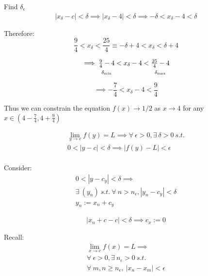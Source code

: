 Find $\delta_\epsilon$
\[
	\begin{gathered}
		|x_\delta - c| < \delta \implies
		|x_\delta - 4| < \delta \implies
		-\delta < x_\delta - 4 < \delta
	\end{gathered}
\]

Therefore:
\[
	\frac{9}{4} < x_\delta < \frac{25}{4} \equiv -\delta + 4 < x_\delta < \delta + 4
\]

\[
	\implies
	\underset{\delta_{\min}}{\rule[-1.5ex]{0pt}{0pt} \tfrac{9}{4} - 4} < x_\delta - 4 <
	\underset{\delta_{\max}}{\rule[-1.5ex]{0pt}{0pt} \tfrac{25}{4} - 4}
\]

\[
	\implies -\frac{7}{4} < x_\delta - 4 < \frac{9}{4}
\]

Thus we can constrain the equation $f(x) \rightarrow 1/2$ as $x \rightarrow 4$ for any $x \in (4-\frac{7}{4}, 4+\frac{9}{4})$


\[
	\begin{gathered}
		\lim_{y \to c} f(y) = L \implies \forall~ \epsilon > 0, \exists~ \delta > 0 ~s.t. \\
		0 < |y-c| < \delta \implies  |f(y) - L| < \epsilon \\
	\end{gathered}
\]

Consider:
\[
	\begin{gathered}
		0 < |y-c_y| < \delta \implies \\
		\exists~ (y_n) ~s.t.~ \forall~ n > n_\epsilon, |y_n - c_y | < \delta \\
		y_n := x_n + c_y
	\end{gathered}
\]

\[
	\begin{gathered}
		|x_n + c - c| < \delta \implies c_x := 0
	\end{gathered}
\]


Recall:
\[
	\begin{gathered}
		\lim_{x \to c} f(x) = L \implies  \\
		\forall~ \epsilon>0, \exists~ n_\epsilon > 0 ~s.t. \\
		\forall~ m,n \geq n_\epsilon, ~|x_n-x_m| < \epsilon
	\end{gathered}
\]

